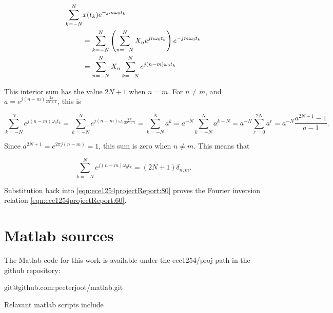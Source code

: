 \documentclass[12pt,journal,compsoc]{../ieeepaper/IEEEtran}
\begin{document}
\begin{equation}\label{eqn:ece1254projectReport:80}
\begin{aligned}
\sum_{k = -N}^N &x(t_k) e^{-j m \omega_0 t_k} \\
&=
\sum_{k = -N}^N 
\lr{
\sum_{n = -N}^N X_n e^{ j n \omega_0 t_k}
}
e^{-j m \omega_0 t_k} \\
&=
\sum_{n = -N}^N X_n 
\sum_{k = -N}^N 
e^{ j (n -m )\omega_0 t_k}
\end{aligned}
\end{equation}

This interior sum has the value \( 2 N + 1 \) when \( n = m \).  For \( n \ne m \), and 
\( a = e^{j (n -m ) \frac{2 \pi}{2 N + 1}} \), this is

\begin{dmath}\label{eqn:ece1254projectReport:100}
\sum_{k = -N}^N 
e^{ j (n -m )\omega_0 t_k}
=
\sum_{k = -N}^N 
e^{ j (n -m )\omega_0 \frac{T k}{2 N + 1}}
=
\sum_{k = -N}^N a^k
=
a^{-N} \sum_{k = -N}^N a^{k+ N}
=
a^{-N} \sum_{r = 0}^{2 N} a^{r}
=
a^{-N} \frac{a^{2 N + 1} - 1}{a - 1}.
\end{dmath}

Since \( a^{2 N + 1} = e^{2 \pi j (n - m)} = 1 \), this sum is zero when \( n \ne m \).  This means that

\begin{equation}\label{eqn:ece1254projectReport:120}
\sum_{k = -N}^N 
e^{ j (n -m )\omega_0 t_k} = (2 N + 1) \delta_{n,m}.
\end{equation}

Substitution back into \cref{eqn:ece1254projectReport:80} proves the Fourier inversion relation \cref{eqn:ece1254projectReport:60}.

\section{Matlab sources}
\label{appendix:matlab}

The Matlab code for this work is available under the ece1254/proj path in the github repository:

\begin{center}
git@github.com:peeterjoot/matlab.git
\end{center}

Relavant matlab scripts include

%
\end{document}
